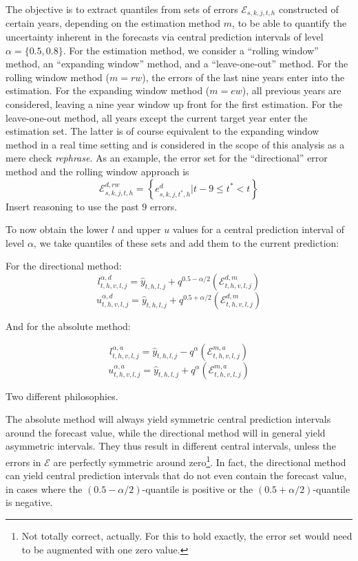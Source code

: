 \documentclass[
]{article}
\begin{document}
The objective is to extract quantiles from sets of errors \(\mathcal{E}_{s,k,j,t,h}\) constructed of certain years, depending on the estimation method \(m\), to be able to quantify the uncertainty inherent in the forecasts via central prediction intervals of level \(\alpha = \{0.5, 0.8\}\). For the estimation method, we consider a ``rolling window'' method, an ``expanding window'' method, and a ``leave-one-out'' method. For the rolling window method (\(m = rw\)), the errors of the last nine years enter into the estimation. For the expanding window method (\(m = ew\)), all previous years are considered, leaving a nine year window up front for the first estimation. For the leave-one-out method, all years except the current target year enter the estimation set. The latter is of course equivalent to the expanding window method in a real time setting and is considered in the scope of this analysis as a mere check \textit{rephrase}.
As an example, the error set for the ``directional'' error method and the rolling window approach is
\[
\mathcal{E}^{d,rw}_{s,k,j,t,h} =  \left\{  e^{d}_{s,k,j,t^*,h} | t-9\leq t^* < t \right\}
\]
Insert reasoning to use the past \(9\) errors.

To now obtain the lower \(l\) and upper \(u\) values for a central prediction interval of level \(\alpha\), we take quantiles of these sets and add them to the current prediction:

For the directional method:
\[
l^{\alpha, d}_{t,h,v,l,j} = \hat{y}_{t, h, l, j} + q^{0.5 - \alpha/2 } \left(\mathcal{E}^{d, m}_{t,h,v,l,j}  \right)
\]
\[
u^{\alpha, d}_{t,h,v,l,j} = \hat{y}_{t, h, l, j} + q^{0.5 + \alpha/2 } \left(\mathcal{E}^{d, m}_{t,h,v,l,j}  \right)
\]

And for the absolute method:

\[
 l^{\alpha, a}_{t,h,v,l,j} = \hat{y}_{t, h, l, j} -  q^{\alpha} \left(\mathcal{E}^{m, a}_{t,h,v,l,j}  \right)
\]
\[
u^{\alpha, a}_{t,h,v,l,j} = \hat{y}_{t, h, l, j} +  q^{\alpha} \left(\mathcal{E}^{m, a}_{t,h,v,l,j}  \right)
\]

Two different philosophies.

The absolute method will always yield symmetric central prediction intervals around the forecast value, while the directional method will in general yield asymmetric intervals. They thus result in different central intervals, unless the errors in \(\mathcal{E}\) are perfectly symmetric around zero\footnote{Not totally correct, actually. For this to hold exactly, the error set would need to be augmented with one zero value.}. In fact, the directional method can yield central prediction intervals that do not even contain the forecast value, in cases where the \((0.5 - \alpha/2)\)-quantile is positive or the \((0.5 + \alpha/2)\)-quantile is negative.
\end{document}
